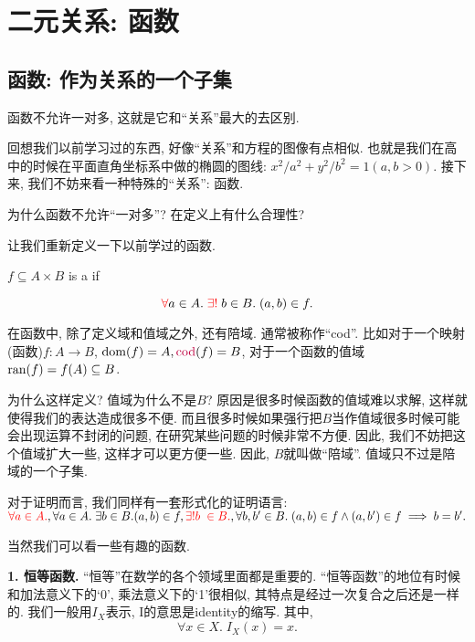 \section{二元关系: 函数}

\subsection{函数: 作为关系的一个子集}

函数不允许一对多, 这就是它和``关系''最大的去区别. 

回想我们以前学习过的东西, 好像``关系''和方程的图像有点相似. 也就是我们在高中的时候在平面直角坐标系中做的椭圆的图线: $x^2/a^2+y^2/b^2=1(a, b>0)$. 接下来, 我们不妨来看一种特殊的``关系'': 函数. 

\begin{bonus}
    为什么函数不允许``一对多''? 在定义上有什么合理性?
\end{bonus}

让我们重新定义一下以前学过的函数. 

\begin{definition}[Function]
    $f \subseteq A \times B$ is a   if

    \[
      \textcolor{red}{\forall} a \in A.\; \textcolor{red}{\exists!} \;b \in B.\; (a, b) \in f.
    \]
\end{definition}

在函数中, 除了定义域和值域之外, 还有陪域. 通常被称作``cod''. 比如对于一个映射(函数)$f: A \to B$, $\text{dom}(f) = A , \textcolor{purple}{\text{cod}}(f) = B$, 对于一个函数的值域$\text{ran}(f) = f(A) \subseteq B$. 

为什么这样定义? 值域为什么不是$B$? 原因是很多时候函数的值域难以求解, 这样就使得我们的表达造成很多不便. 而且很多时候如果强行把$B$当作值域很多时候可能会出现运算不封闭的问题, 在研究某些问题的时候非常不方便. 因此, 我们不妨把这个值域扩大一些, 这样才可以更方便一些. 因此, $B$就叫做``陪域''. 值域只不过是陪域的一个子集. 

对于证明而言, 我们同样有一套形式化的证明语言: 
$\textcolor{red}{\forall a \in A.}, \forall a \in A.\; \exists b \in B. (a, b) \in f, \textcolor{red}{\exists! b \;\in B.}, \forall b, b' \in B.\; (a, b) \in f \land (a, b') \in f \implies b = b'.$

当然我们可以看一些有趣的函数. 

\textbf{1. 恒等函数. } ``恒等''在数学的各个领域里面都是重要的. ``恒等函数''的地位有时候和加法意义下的`0', 乘法意义下的`1'很相似, 其特点是经过一次复合之后还是一样的. 我们一般用$I_X$表示, I的意思是identity的缩写. 其中, 
$$\forall x \in X.\; I_{X}(x) = x.$$

